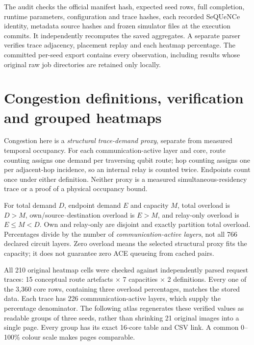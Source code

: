 \documentclass[10pt,a4paper,oneside]{report}
\begin{document}
The audit checks the official manifest hash, expected seed rows, full completion, runtime parameters, configuration and trace hashes, each recorded SeQUeNCe identity, metadata source hashes and frozen simulator files at the execution commits. It independently recomputes the saved aggregates. A separate parser verifies trace adjacency, placement replay and each heatmap percentage. The committed per-seed export contains every observation, including results whose original raw job directories are retained only locally.

\chapter{Congestion definitions, verification and grouped heatmaps}
Congestion here is a \emph{structural trace-demand proxy}, separate from measured temporal occupancy. For each communication-active layer and core, route counting assigns one demand per traversing qubit route; hop counting assigns one per adjacent-hop incidence, so an internal relay is counted twice. Endpoints count once under either definition. Neither proxy is a measured simultaneous-residency trace or a proof of a physical occupancy bound.

For total demand $D$, endpoint demand $E$ and capacity $M$, total overload is $D>M$, own/source--destination overload is $E>M$, and relay-only overload is $E\le M<D$. Own and relay-only are disjoint and exactly partition total overload. Percentages divide by the number of \emph{communication-active layers}, not all 766 declared circuit layers. Zero overload means the selected structural proxy fits the capacity; it does not guarantee zero ACE queueing from cached pairs.

All 210 original heatmap cells were checked against independently parsed request traces: 15 conceptual route artefacts $\times$ 7 capacities $\times$ 2 definitions. Every one of the 3,360 core rows, containing three overload percentages, matches the stored data. Each trace has 226 communication-active layers, which supply the percentage denominator. The following atlas regenerates these verified values as readable groups of three seeds, rather than shrinking 21 original images into a single page. Every group has its exact 16-core table and CSV link. A common 0--100\% colour scale makes pages comparable.
\end{document}
